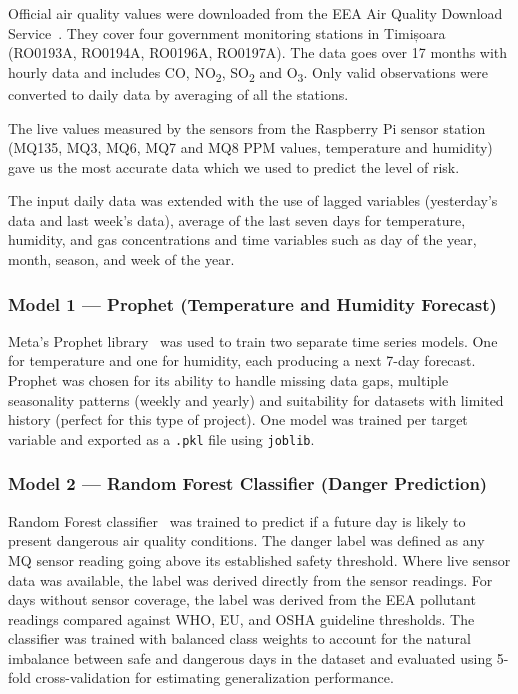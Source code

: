 Official air quality values were downloaded from the EEA Air Quality Download
Service~\cite{eea}. They cover four government monitoring stations in Timișoara (RO0193A,
RO0194A, RO0196A, RO0197A). The data goes over 17 months with hourly data and includes CO,
NO\textsubscript{2}, SO\textsubscript{2} and O\textsubscript{3}. Only valid observations were
converted to daily data by averaging of all the stations.

The live values measured by the sensors from the Raspberry Pi sensor station (MQ135, MQ3, MQ6,
MQ7 and MQ8 PPM values, temperature and humidity) gave us the most accurate data which we used
to predict the level of risk.

The input daily data was extended with the use of lagged variables (yesterday's data and last
week's data), average of the last seven days for temperature, humidity, and gas concentrations
and time variables such as day of the year, month, season, and week of the year.

\subsubsection{Model 1 — Prophet (Temperature and Humidity Forecast)}

Meta's Prophet library~\cite{prophet} was used to train two separate time series models. One
for temperature and one for humidity, each producing a next 7-day forecast. Prophet was chosen
for its ability to handle missing data gaps, multiple seasonality patterns (weekly and yearly)
and suitability for datasets with limited history (perfect for this type of project). One model
was trained per target variable and exported as a \texttt{.pkl} file using \texttt{joblib}.

\subsubsection{Model 2 — Random Forest Classifier (Danger Prediction)}

Random Forest classifier~\cite{sklearn} was trained to predict if a future day is likely to
present dangerous air quality conditions. The danger label was defined as any MQ sensor reading
going above its established safety threshold. Where live sensor data was available, the label
was derived directly from the sensor readings. For days without sensor coverage, the label was
derived from the EEA pollutant readings compared against WHO, EU, and OSHA guideline
thresholds. The classifier was trained with balanced class weights to account for the natural
imbalance between safe and dangerous days in the dataset and evaluated using 5-fold
cross-validation for estimating generalization performance.

